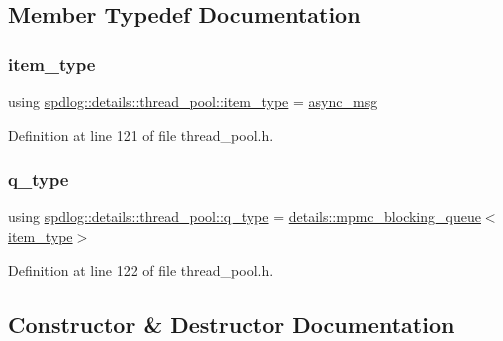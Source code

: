 \subsection{Member Typedef Documentation}
\mbox{\label{classspdlog_1_1details_1_1thread__pool_a997d954a51e8fa8aa92071d1a9c08536}} 
\subsubsection{\texorpdfstring{item\+\_\+type}{item\_type}}
{\footnotesize\ttfamily using \hyperlink{classspdlog_1_1details_1_1thread__pool_a997d954a51e8fa8aa92071d1a9c08536}{spdlog\+::details\+::thread\+\_\+pool\+::item\+\_\+type} =  \hyperlink{structspdlog_1_1details_1_1async__msg}{async\+\_\+msg}}



Definition at line 121 of file thread\+\_\+pool.\+h.

\mbox{\label{classspdlog_1_1details_1_1thread__pool_a77d633d56b0b5e1fe37965faa4642df5}} 
\subsubsection{\texorpdfstring{q\+\_\+type}{q\_type}}
{\footnotesize\ttfamily using \hyperlink{classspdlog_1_1details_1_1thread__pool_a77d633d56b0b5e1fe37965faa4642df5}{spdlog\+::details\+::thread\+\_\+pool\+::q\+\_\+type} =  \hyperlink{classspdlog_1_1details_1_1mpmc__blocking__queue}{details\+::mpmc\+\_\+blocking\+\_\+queue}$<$\hyperlink{classspdlog_1_1details_1_1thread__pool_a997d954a51e8fa8aa92071d1a9c08536}{item\+\_\+type}$>$}



Definition at line 122 of file thread\+\_\+pool.\+h.



\subsection{Constructor \& Destructor Documentation}
\mbox{\label{classspdlog_1_1details_1_1thread__pool_a2ac821eb936f7373cc51949fb05e841c}} 
